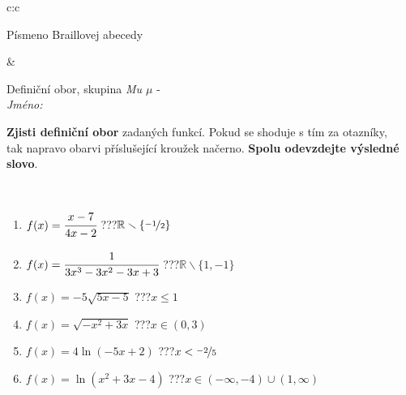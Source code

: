 \documentclass[10pt]{report}
\begin{document}
\begin{tabular}{c:c}
\begin{minipage}[c][104.5mm][t]{0.5\linewidth}
\begin{center}
\begin{minipage}{0.20\linewidth}
\begin{center}
{\small Písmeno Braillovej abecedy}
\end{center}
\end{minipage}
\end{center}
\end{minipage}
&
\begin{minipage}[c][104.5mm][t]{0.5\linewidth}
\begin{center}
\vspace{7mm}
{\huge Definiční obor, skupina \textit{Mu $\mu$} -}\\[5mm]
\textit{Jméno:}\phantom{xxxxxxxxxxxxxxxxxxxxxxxxxxxxxxxxxxxxxxxxxxxxxxxxxxxxxxxxxxxxxxxxx}\\[5mm]
\begin{minipage}{0.95\linewidth}
\begin{center}
\textbf{Zjisti definiční obor} zadaných funkcí. Pokud se shoduje s tím za otazníky,\\tak napravo obarvi příslušející kroužek načerno. \textbf{Spolu odevzdejte výsledné slovo}.
\end{center}
\end{minipage}
\\[1mm]
\begin{minipage}{0.79\linewidth}
\begin{center}
\begin{varwidth}{\linewidth}
\begin{enumerate}
\normalsizerrr
\item $f(x)=\cfrac{x-7}{4x-2}$\quad \dotfill\; ???\;\dotfill \quad $\mathbb{R}\smallsetminus\{\nicefrac{-1}{2}\}$
\item $f(x)=\cfrac{1}{3x^3-3x^2-3x+3}$\quad \dotfill\; ???\;\dotfill \quad $\mathbb{R}\smallsetminus\{1,-1\}$
\item $f(x)=-5\sqrt{5x-5}$\quad \dotfill\; ???\;\dotfill \quad $x\leq1$
\item $f(x)=\sqrt{-x^2+3x}$\quad \dotfill\; ???\;\dotfill \quad $x\in(0 , 3)$
\item $f(x)=4\ln{(-5x+2)}$\quad \dotfill\; ???\;\dotfill \quad $x<\nicefrac{-2}{5}$
\item $f(x)=\ln{(x^2+3x-4)}$\quad \dotfill\; ???\;\dotfill \quad $x\in(-\infty , -4)\cup(1 , \infty)$
\end{enumerate}
\end{varwidth}
\end{center}
\end{minipage}
\begin{minipage}{0.20\linewidth}
\begin{center}

\end{center}
\end{minipage}
\end{center}
\end{minipage}
\end{tabular}
\end{document}
